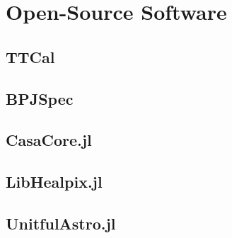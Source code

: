 \chapter{Open-Source Software}

\section{TTCal}

\section{BPJSpec}

\section{CasaCore.jl}

\section{LibHealpix.jl}

\section{UnitfulAstro.jl}


